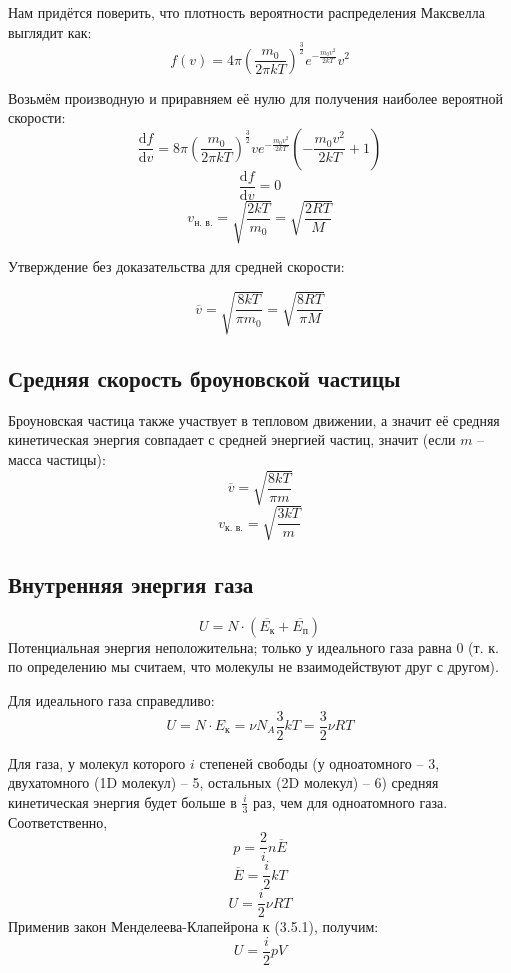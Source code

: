
Нам придётся поверить, что плотность вероятности распределения Максвелла выглядит как:
\[f(v) = 4\pi(\frac{m_0}{2\pi k T})^{\frac{3}{2}}e^{-\frac{m_0v^2}{2 k T}}v^2\]

Возьмём производную и приравняем её нулю для получения наиболее вероятной скорости:
\[\frac{\text{d}f}{\text{d}v}=8\pi(\frac{m_0}{2\pi k T})^{\frac{3}{2}}ve^{-\frac{m_0v^2}{2 k T}}(-\frac{m_0 v^2}{2kT}+1)\]
\[\frac{\text{d}f}{\text{d}v}=0\]
\[v_{\text{н. в.}}=\sqrt{\frac{2kT}{m_0}}=\sqrt{\frac{2RT}{M}}\]

Утверждение без доказательства для средней скорости:\par
\[\overline{v}=\sqrt{\frac{8kT}{\pi m_0}}=\sqrt{\frac{8RT}{\pi M}}\]



\subsection{Средняя скорость броуновской частицы}
Броуновская частица также участвует в тепловом движении, а значит её средняя кинетическая энергия совпадает с средней энергией частиц, значит (если $m$ -- масса частицы):
\[\overline{v}=\sqrt{\frac{8kT}{\pi m}}\]
\[v_{\text{к. в.}}=\sqrt{\frac{3kT}{m}}\]



\subsection{Внутренняя энергия газа}
\[U=N \cdot (\overline{E_\text{к}}+\overline{E_\text{п}})\]
Потенциальная энергия неположительна; только у идеального газа равна 0 (т. к. по определению мы считаем, что молекулы не взаимодействуют друг с другом).\par

Для идеального газа справедливо:
\[U=N\cdot E_{\text{к}}=\nu N_A \frac{3}{2}kT=\frac{3}{2} \nu RT\]

Для газа, у молекул которого $i$ степеней свободы (у одноатомного -- 3, двухатомного (1D молекул) -- 5, остальных (2D молекул) -- 6) средняя кинетическая энергия будет больше в $\frac{i}{3}$ раз, чем для одноатомного газа. Соответственно,
\[ p = \frac{2}{i} n \overline{E} \]
\[ \overline{E}=\frac{i}{2}kT \]
\begin{equation}
U=\frac{i}{2}\nu RT
\end{equation}
Применив закон Менделеева-Клапейрона к (3.5.1), получим:
\begin{equation*}
U=\frac{i}{2}pV
\end{equation*}